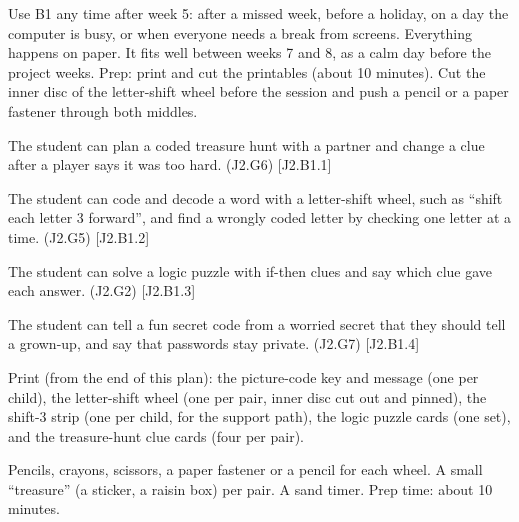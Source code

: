 
\begin{teachernote}
Use B1 any time after week 5: after a missed week, before a holiday, on a day the computer is busy, or when everyone needs a break from screens. Everything happens on paper. It fits well between weeks 7 and 8, as a calm day before the project weeks. Prep: print and cut the printables (about 10 minutes). Cut the inner disc of the letter-shift wheel before the session and push a pencil or a paper fastener through both middles.
\end{teachernote}

\begin{objectives}
  \item The student can plan a coded treasure hunt with a partner and change a clue after a player says it was too hard. (J2.G6) [J2.B1.1]
  \item The student can code and decode a word with a letter-shift wheel, such as \enquote{shift each letter 3 forward}, and find a wrongly coded letter by checking one letter at a time. (J2.G5) [J2.B1.2]
  \item The student can solve a logic puzzle with if-then clues and say which clue gave each answer. (J2.G2) [J2.B1.3]
  \item The student can tell a fun secret code from a worried secret that they should tell a grown-up, and say that passwords stay private. (J2.G7) [J2.B1.4]
\end{objectives}

\begin{materials}
  \item Print (from the end of this plan): the picture-code key and message (one per child), the letter-shift wheel (one per pair, inner disc cut out and pinned), the shift-3 strip (one per child, for the support path), the logic puzzle cards (one set), and the treasure-hunt clue cards (four per pair).
  \item Pencils, crayons, scissors, a paper fastener or a pencil for each wheel. A small \enquote{treasure} (a sticker, a raisin box) per pair. A sand timer. Prep time: about 10 minutes.
\end{materials}

